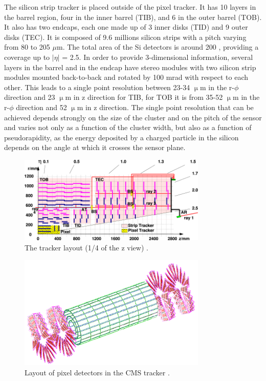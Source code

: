 The silicon strip tracker is placed outside of the pixel tracker. It has 10 layers in the barrel region, four in the inner barrel (TIB), and 6 in the outer barrel (TOB). It also has two endcaps, each one made up of 3 inner disks (TID) and 9 outer disks (TEC). It is composed of 9.6 millions silicon strips with a pitch varying from 80 to 205 $\mu \mathrm{m}$. The total area of the Si detectors is around 200 \mTwo, providing a coverage up to $|\eta|$ = 2.5. In order to provide 3-dimensional information, several layers in the barrel and in the endcap have stereo modules with two silicon strip modules mounted back-to-back and rotated by 100 mrad with respect to each other.
This leads to a single point resolution between 23-34 $\upmu$m in the r-$\phi$ direction and 23 $\upmu$m in z direction for TIB, for TOB it is from 35-52 $\upmu$m in the r-$\phi$ direction and 52 $\upmu$m in z direction. The single point resolution that can be achieved depends strongly on the size of the cluster and on the pitch of the sensor and varies not only as a function of the cluster width, but also as a function of pseudorapidity, as the energy deposited by a charged particle in the silicon depends on the angle at which it crosses the sensor plane.
\begin{figure}[h!]
\begin{center}
\includegraphics[width=0.8\textwidth]{figures/CMS/tracker/cms_tracker.png}
\caption{The tracker layout (1/4 of the z view) \cite{Chatrchyan:2008aa}.}
\label{fig:CMS_tracker}
\end{center}
\end{figure}

\begin{figure}[h!]
\begin{center}
\includegraphics[width=0.8\textwidth]{figures/CMS/tracker/cms_pixelDetector.png}
\caption{Layout of pixel detectors in the CMS tracker \cite{Chatrchyan:2008aa}.}
\label{fig:CMS_pixel_detector}
\end{center}
\end{figure}

